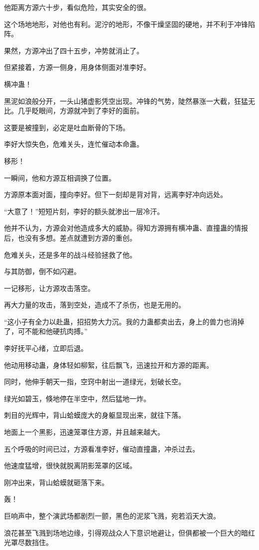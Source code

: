 \begin{this_body}
他距离方源六十步，看似危险，其实安全的很。

这个场地地形，对他也有利。泥泞的地形，不像干燥坚固的硬地，并不利于冲锋陷阵。

果然，方源冲出了四十五步，冲势就消止了。

但紧接着，方源一侧身，用身体侧面对准李好。

横冲蛊！

黑泥如浪般分开，一头山猪虚影凭空出现。冲锋的气势，陡然暴涨一大截，狂猛无比。几乎眨眼间，方源就冲到了李好的面前。

这要是被撞到，必定是吐血断骨的下场。

李好大惊失色，危难关头，连忙催动本命蛊。

移形！

一瞬间，他和方源互相调换了位置。

方源原本面对面，撞向李好。但下一刻却是背对背，远离李好冲向远处。

“大意了！”短短片刻，李好的额头就渗出一层冷汗。

他并不认为，方源会对他造成多大的威胁。得知方源拥有横冲蛊、直撞蛊的情报后，也没有多想。差点就遭到方源的重创。

危难关头，还是多年的战斗经验拯救了他。

与其防御，倒不如闪避。

一记移形，让方源攻击落空。

再大力量的攻击，落到空处，造成不了杀伤，也是无用的。

“这小子有全力以赴蛊，招招势大力沉。我的力蛊都卖出去，身上的兽力也消掉了，可不能和他硬抗肉搏。”

李好抚平心绪，立即后退。

他动用移动蛊，身体轻如柳絮，往后飘飞，迅速拉开和方源的距离。

同时，他伸手朝天一指，空窍中射出一道绿光，划破长空。

绿光如碧玉，倏地停在半空中，然后猛地一炸。

刺目的光辉中，背山蛤蟆庞大的身躯显现出来，就往下落。

地面上一个黑影，迅速笼罩住方源，并且越来越大。

五个呼吸的时间已过，方源看准李好，催动直撞蛊，冲杀过去。

他速度猛增，很快就脱离阴影笼罩的区域。

刚冲出来，背山蛤蟆就砸落下来。

轰！

巨响声中，整个演武场都剧烈一颤，黑色的泥浆飞溅，宛若滔天大浪。

浪花甚至飞溅到场地边缘，引得观战众人下意识地避让，但俱都被一个巨大的暗红光罩尽数挡住。


\end{this_body}
